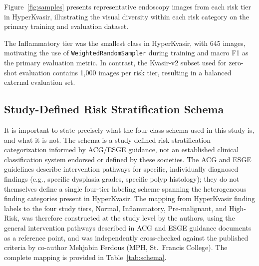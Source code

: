 \documentclass[11pt,a4paper]{article}
\begin{document}
Figure~\ref{fig:samples} presents representative endoscopy images from each
risk tier in HyperKvasir, illustrating the visual diversity within each
risk category on the primary training and evaluation dataset.

The Inflammatory tier was the smallest class in HyperKvasir, with 645 images,
motivating the use of \texttt{WeightedRandomSampler} during training and macro
F1 as the primary evaluation metric. In contrast, the Kvasir-v2 subset used
for zero-shot evaluation contains 1,000 images per risk tier, resulting in a
balanced external evaluation set.


\subsection{Study-Defined Risk Stratification Schema}
\label{sec:schema}

It is important to state precisely what the four-class schema used in this
study is, and what it is not. The schema is a study-defined risk
stratification categorization informed by ACG/ESGE guidance, not an
established clinical classification system endorsed or defined by these
societies. The ACG and ESGE guidelines describe intervention pathways for
specific, individually diagnosed findings (e.g., specific dysplasia grades,
specific polyp histology); they do not themselves define a single four-tier
labeling scheme spanning the heterogeneous finding categories present in
HyperKvasir. The mapping from HyperKvasir finding labels to the four study
tiers, Normal, Inflammatory, Pre-malignant, and High-Risk, was therefore
constructed at the study level by the authors, using the general
intervention pathways described in ACG and ESGE guidance
documents~\citep{Shaukat2021,Ferlitsch2017} as a reference point, and was
independently cross-checked against the published criteria by co-author
Mehjabin Ferdous (MPH, St.\ Francis College). The complete mapping is
provided in Table~\ref{tab:schema}.
\end{document}
